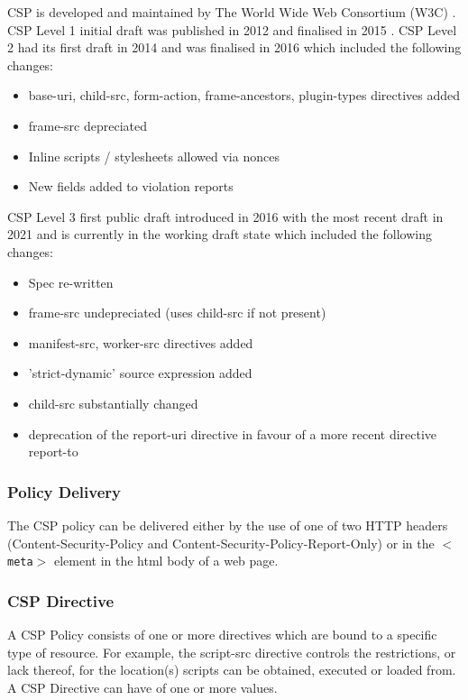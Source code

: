 \documentclass{mscreport}
\begin{document}
CSP is developed and maintained by The World Wide Web Consortium (W3C) \cite{Barth2012-ow}.
CSP Level 1 initial draft was published in 2012 \cite{Barth2012-ow} and finalised in 2015 \cite{Barth2015-ez}.
CSP Level 2 had its first draft in 2014 \cite{West2014-oe} and was finalised in 2016 \cite{West2016-ol} which included the following changes:
\begin{itemize}
	\setlength\itemsep{0.1em}
	\item base-uri, child-src, form-action, frame-ancestors, plugin-types directives added
	\item frame-src depreciated
	\item Inline scripts / stylesheets allowed via nonces
	\item New fields added to violation reports
\end{itemize}

\vspace{0.3cm} \noindent
CSP Level 3 first public draft introduced in 2016 \cite{West2016-xj} with the most recent draft in 2021 \cite{West2021-hi} and is currently in the working draft state which included the following changes:
\begin{itemize}
	\setlength\itemsep{0.1em}
	\item Spec re-written
	\item frame-src undepreciated (uses child-src if not present)
	\item manifest-src, worker-src directives added
	\item 'strict-dynamic' source expression added
	\item child-src substantially changed
	\item deprecation of the report-uri directive in favour of a more recent directive report-to
\end{itemize}


\subsubsection{Policy Delivery}
The CSP policy can be delivered either by the use of one of two HTTP headers (Content-Security-Policy and Content-Security-Policy-Report-Only) or in the \texttt{$<$meta$>$} element in the html body of a web page.

\subsubsection{CSP Directive}
A CSP Policy consists of one or more directives which are bound to a specific type of resource. For example, the script-src directive controls the restrictions, or lack thereof, for the location(s) scripts can be obtained, executed or loaded from. A CSP Directive can have of one or more values.
\end{document}
